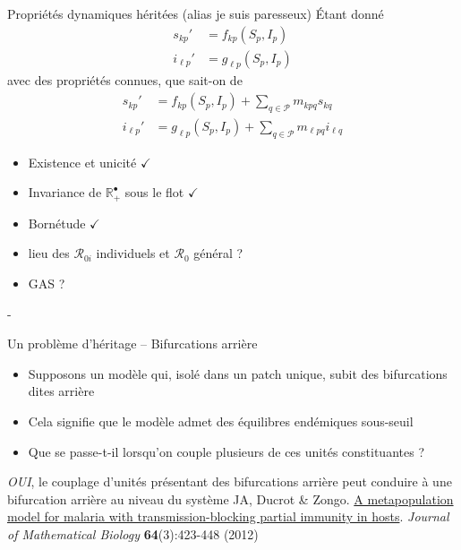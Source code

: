 \documentclass[aspectratio=169]{beamer}\usepackage[]{graphicx}\usepackage[]{xcolor}
\begin{document}
\begin{frame}{Propriétés dynamiques héritées (alias je suis paresseux)}
	Étant donné
	\begin{subequations}
		\begin{align}
			s_{kp}' &= f_{kp}(S_p,I_p) \label{sys:generic_intra_ds} \\
			i_{\ell p}' &= g_{\ell p}(S_p,I_p) \label{sys:generic_intra_di}
		\end{align}				
	\end{subequations}
	avec des propriétés connues, que sait-on de
	\begin{subequations}
		\begin{align}
			s_{kp}' &= f_{kp}(S_p,I_p)+\textstyle{\sum_{q\in\mathcal{P}}} m_{kpq}s_{kq} 
			\label{sys:generic_inter_ds} \\
			i_{\ell p}' &= g_{\ell p}(S_p,I_p)+\textstyle{\sum_{q\in\mathcal{P}}} m_{\ell pq}i_{\ell q}
			\label{sys:generic_inter_di}
		\end{align}				
	\end{subequations}
	\begin{itemize}
		\item Existence et unicité $\checkmark$
		\item Invariance de $\mathbb{R}_+^\bullet$ sous le flot $\checkmark$
		\item Bornétude $\checkmark$
		\item lieu des $\mathcal{R}_{0i}$ individuels et $\mathcal{R}_0$ général ?
		\item GAS ?		
	\end{itemize}
	- 
\end{frame}

\begin{frame}{Un problème d'héritage -- Bifurcations arrière}
	\begin{itemize}
		\item Supposons un modèle qui, isolé dans un patch unique, subit des bifurcations dites arrière
		\item Cela signifie que le modèle admet des équilibres endémiques sous-seuil
		\item Que se passe-t-il lorsqu'on couple plusieurs de ces unités constituantes ?
	\end{itemize}
	\vfill
	\emph{OUI}, le couplage d'unités présentant des bifurcations arrière peut conduire à une bifurcation arrière au niveau du système
	\vfill
	JA, Ducrot \& Zongo. \href{https://julien-arino.github.io/assets/pdf/papers/2012_ArinoDucrotZongo-JMB64.pdf}{A metapopulation model for malaria with transmission-blocking partial immunity in hosts}. \emph{Journal of Mathematical Biology} \textbf{64}(3):423-448 (2012) 		
\end{frame}
\end{document}
